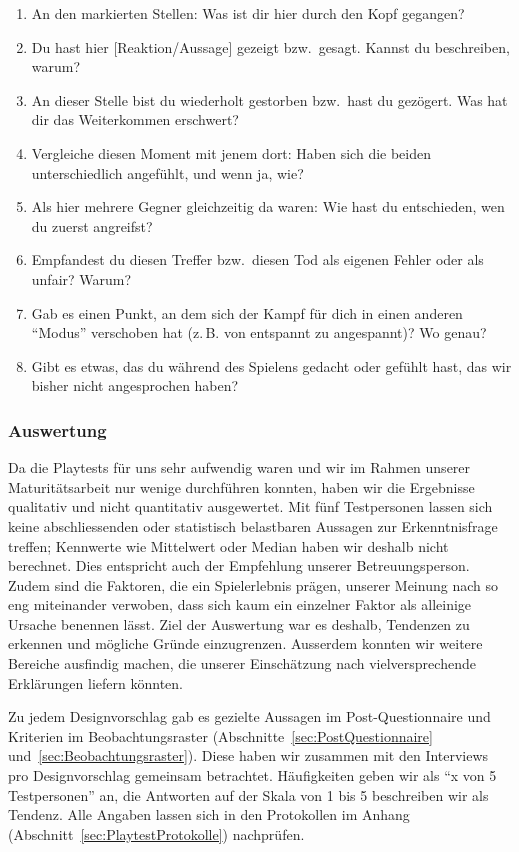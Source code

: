 \documentclass[../Main.tex]{subfiles}
\begin{document}
\begin{enumerate}[label=\textbf{I\arabic*}, leftmargin=1.5cm, itemsep=0.5em]
    \item An den markierten Stellen: Was ist dir hier durch den Kopf gegangen?
    \item Du hast hier [Reaktion/Aussage] gezeigt bzw.\ gesagt. Kannst du beschreiben, warum?
    \item An dieser Stelle bist du wiederholt gestorben bzw.\ hast du gezögert. Was hat dir das Weiterkommen erschwert?
    \item Vergleiche diesen Moment mit jenem dort: Haben sich die beiden unterschiedlich angefühlt, und wenn ja, wie?
    \item Als hier mehrere Gegner gleichzeitig da waren: Wie hast du entschieden, wen du zuerst angreifst?
    \item Empfandest du diesen Treffer bzw.\ diesen Tod als eigenen Fehler oder als unfair? Warum?
    \item Gab es einen Punkt, an dem sich der Kampf für dich in einen anderen \enquote{Modus} verschoben hat (z.\,B. von entspannt zu angespannt)? Wo genau?
    \item Gibt es etwas, das du während des Spielens gedacht oder gefühlt hast, das wir bisher nicht angesprochen haben?
\end{enumerate}

\subsubsection{Auswertung} \label{sec:Auswertung}
Da die Playtests für uns sehr aufwendig waren und wir im Rahmen unserer Maturitätsarbeit nur wenige durchführen konnten, haben wir die Ergebnisse qualitativ und nicht quantitativ ausgewertet. Mit fünf Testpersonen lassen sich keine abschliessenden oder statistisch belastbaren Aussagen zur Erkenntnisfrage treffen; Kennwerte wie Mittelwert oder Median haben wir deshalb nicht berechnet. Dies entspricht auch der Empfehlung unserer Betreuungsperson. Zudem sind die Faktoren, die ein Spielerlebnis prägen, unserer Meinung nach so eng miteinander verwoben, dass sich kaum ein einzelner Faktor als alleinige Ursache benennen lässt. Ziel der Auswertung war es deshalb, Tendenzen zu erkennen und mögliche Gründe einzugrenzen. Ausserdem konnten wir weitere Bereiche ausfindig machen, die unserer Einschätzung nach vielversprechende Erklärungen liefern könnten.

Zu jedem Designvorschlag gab es gezielte Aussagen im Post-Questionnaire und Kriterien im Beobachtungsraster (Abschnitte~\ref{sec:PostQuestionnaire} und~\ref{sec:Beobachtungsraster}). Diese haben wir zusammen mit den Interviews pro Designvorschlag gemeinsam betrachtet. Häufigkeiten geben wir als \enquote{x von 5 Testpersonen} an, die Antworten auf der Skala von 1 bis 5 beschreiben wir als Tendenz. Alle Angaben lassen sich in den Protokollen im Anhang (Abschnitt~\ref{sec:PlaytestProtokolle}) nachprüfen.
\end{document}
